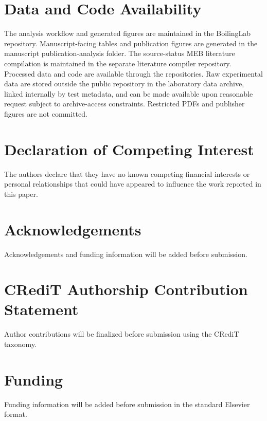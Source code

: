 \documentclass[final,1p,times]{elsarticle}
\begin{document}
\section*{Data and Code Availability}

The analysis workflow and generated figures are maintained in the BoilingLab repository. Manuscript-facing tables and publication figures are generated in the manuscript publication-analysis folder. The source-status MEB literature compilation is maintained in the separate literature compiler repository. Processed data and code are available through the repositories. Raw experimental data are stored outside the public repository in the laboratory data archive, linked internally by test metadata, and can be made available upon reasonable request subject to archive-access constraints. Restricted PDFs and publisher figures are not committed.

\section*{Declaration of Competing Interest}

The authors declare that they have no known competing financial interests or personal relationships that could have appeared to influence the work reported in this paper.

\section*{Acknowledgements}

Acknowledgements and funding information will be added before submission.

\section*{CRediT Authorship Contribution Statement}

Author contributions will be finalized before submission using the CRediT taxonomy.

\section*{Funding}

Funding information will be added before submission in the standard Elsevier format.


\end{document}
